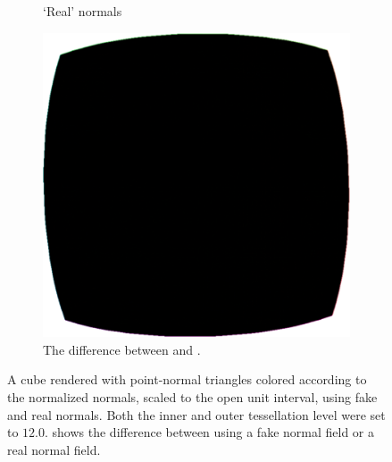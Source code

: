 \begin{figure}
\begin{subfigure}[t]{0.32\linewidth}
		\caption{`Real' normals}
		\label{fig:results:normals:original:real}
	\end{subfigure}	
	\begin{subfigure}[t]{0.32\linewidth}
		\centering
		\includegraphics[width=\textwidth]{content/img/results/normals/cubeNormalsDifference.png}
		\caption{The difference between  and .}
		\label{fig:results:normals:original:difference}
	\end{subfigure}		
	\caption{A cube rendered with point-normal triangles colored according to the normalized normals, scaled to the open unit interval, using  fake and  real normals. Both the inner and outer tessellation level were set to $12.0$.  shows the difference between  using  a fake normal field or  a real normal field.}
	\label{fig:results:normals:original}
\end{figure}

